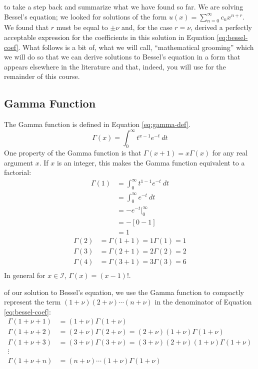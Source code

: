  to take a step back and summarize what we have found so far.  We are solving Bessel's equation; we looked for solutions of the form $u(x)=\sum_{n=0}^{\infty} c_n x^{n+r}$.  We found that $r$ must be equal to $\pm \nu$ and, for the case $r = \nu$, derived a perfectly acceptable expression for the coefficients in this solution in Equation \ref{eq:bessel-coef}. What follows is a bit of, what we will call, ``mathematical grooming'' which we will do so that we can derive solutions to Bessel's equation in a form that appears elsewhere in the literature and that, indeed, you will use for the remainder of this course.
\subsection{Gamma Function}
The Gamma function is defined in Equation \ref{eq:gamma-def}.
\begin{equation}
\Gamma(x) = \int_0^{\infty} t^{x-1}e^{-t} \ dt
\label{eq:gamma-def}
\end{equation}
One property of the Gamma function is that $\Gamma(x+1) = x \Gamma(x)$ for any real argument $x$. If $x$ is an integer, this makes the Gamma function equivalent to a factorial: 
\begin{align*}
\Gamma(1) &= \int_0^{\infty}t^{1-1} e^{-t} \ dt \\
&= \int_0^{\infty}e^{-t} \ dt \\
&= -e^{-t}\Bigr|_0^{\infty} \\
&= -[0 - 1] \\
&= 1
\end{align*}
\begin{align*}
\Gamma(2) &= \Gamma(1+1) = 1\Gamma(1) = 1 \\
\Gamma(3) &= \Gamma(2+1) = 2\Gamma(2) = 2 \\
\Gamma(4) &= \Gamma(3+1) = 3\Gamma(3) = 6 \\
\end{align*}
In general for $x \in \mathcal{I}$, $\Gamma(x) = (x-1)!$. 

 of our solution to Bessel's equation, we use the Gamma function to compactly represent the term $(1+\nu)(2+\nu)\cdots(n+\nu)$ in the denominator of Equation \ref{eq:bessel-coef}:
\begin{align*}
\Gamma(1+\nu+1) &= (1+\nu)\Gamma(1+\nu) \\
\Gamma(1+\nu+2) &= (2+\nu)\Gamma(2+\nu) = (2+\nu)(1+\nu)\Gamma(1+\nu) \\
\Gamma(1+\nu+3) &= (3+\nu)\Gamma(3+\nu) = (3+\nu)(2+\nu)(1+\nu)\Gamma(1+\nu) \\
\vdots \\
\Gamma(1+\nu+n) &= (n+\nu)\cdots(1+\nu)\Gamma(1+\nu)
\end{align*}

